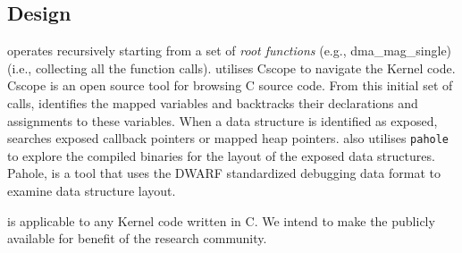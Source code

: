 \subsection{Design}
\tool operates recursively starting from a set of \textit{root functions} (e.g., dma\_mag\_single) (i.e., collecting all the function calls). \tool utilises Cscope \cite{cscope,cscope_92} to navigate the Kernel code. Cscope is an open source tool for browsing C source code. From this initial set of calls, \tool identifies the mapped variables and backtracks their declarations and assignments to these variables. When a data structure is identified as exposed, \tool searches
exposed callback pointers or mapped heap pointers. \tool also utilises \texttt{pahole} \cite{dwarves} to explore the compiled binaries for the layout of the exposed data structures. Pahole, is a tool that uses the DWARF \cite{dwarf} standardized debugging data format to examine data structure layout.

\tool is applicable to any Kernel code written in C. We intend to make the \tool publicly available for benefit of the research community.


